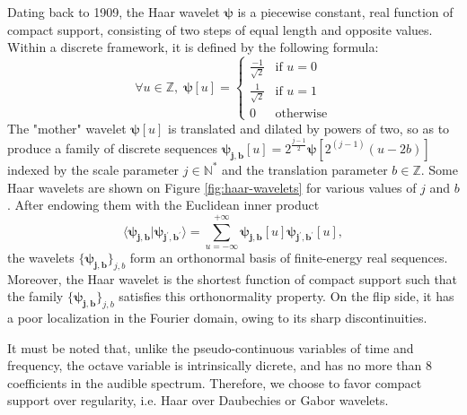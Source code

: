 \documentclass{article}
\makeatletter
\newcommand*{\ie}{i.e.\@\xspace}
\makeatother
\begin{document}
Dating back to 1909, the Haar wavelet $\boldsymbol{\psi}$ is a piecewise constant,
real function of compact support,
consisting of two steps of equal length and opposite values.
Within a discrete framework,
it is defined by the following formula:
\begin{equation}
\forall u \in \mathbb{Z}, \;
\boldsymbol{\psi}[u] = \left\{ \begin{array}{cl}
\frac{-1}{\sqrt{2}} & \mbox{if }u = 0\\
\frac{1}{\sqrt{2}} & \mbox{if }u = 1\\
0 & \mbox{otherwise}
\end{array}\right.
\end{equation}
The "mother" wavelet $\boldsymbol{\psi}[u]$ is translated and dilated by powers of two, so as to
produce a family of discrete sequences
$\boldsymbol{\psi_{j,b}}[u] = 2^{\frac{j-1}{2}} \boldsymbol{\psi}[2^{(j-1)} (u - 2b)]$
indexed by the scale parameter $j \in \mathbb{N^*}$
and the translation parameter $b \in \mathbb{Z}$.
Some Haar wavelets are shown on Figure \ref{fig:haar-wavelets}
for various values of $j$ and $b$.
After endowing them with the Euclidean inner product
\begin{equation}
\langle \boldsymbol{\psi_{j,b}} \vert \boldsymbol{\psi_{j^\prime,b^\prime}} \rangle
 =
 \sum_{u = -\infty}^{+\infty}
 \boldsymbol{\psi_{j, b}}[u]
  \boldsymbol{\psi_{j^\prime,b^\prime}}[u],
\end{equation}
the wavelets $\{\boldsymbol{\psi_{j,b}}\}_{j,b}$ form an orthonormal basis of finite-energy
real sequences.
Moreover, the Haar wavelet is the shortest function of compact support such that the family
$\{\boldsymbol{\psi_{j,b}}\}_{j,b}$ satisfies this orthonormality property.
On the flip side, it has a poor localization in the Fourier domain, owing to its sharp discontinuities.

It must be noted that, unlike the pseudo-continuous variables of time and frequency,
the octave variable is intrinsically dicrete, and has no more than 8 coefficients in
the audible spectrum.
Therefore, we choose to favor compact support over regularity, \ie Haar over
Daubechies or Gabor wavelets.
\end{document}
